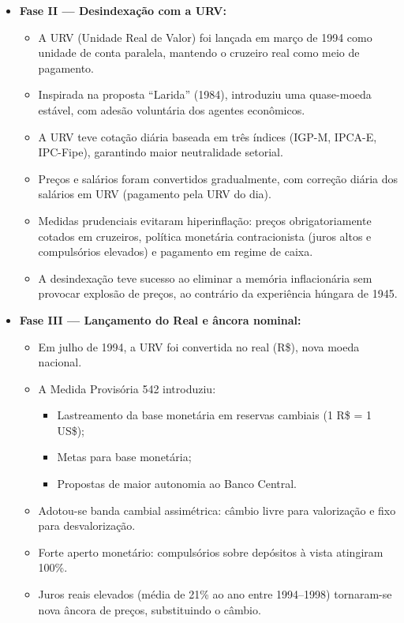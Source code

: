 \documentclass[a4paper,12pt]{article}[abntex2]
\begin{document}
\begin{itemize}
    \item \textbf{Fase II — Desindexação com a URV:}
    \begin{itemize}
        \item A URV (Unidade Real de Valor) foi lançada em março de 1994 como unidade de conta paralela, mantendo o cruzeiro real como meio de pagamento.
        \item Inspirada na proposta “Larida” (1984), introduziu uma quase-moeda estável, com adesão voluntária dos agentes econômicos.
        \item A URV teve cotação diária baseada em três índices (IGP-M, IPCA-E, IPC-Fipe), garantindo maior neutralidade setorial.
        \item Preços e salários foram convertidos gradualmente, com correção diária dos salários em URV (pagamento pela URV do dia).
        \item Medidas prudenciais evitaram hiperinflação: preços obrigatoriamente cotados em cruzeiros, política monetária contracionista (juros altos e compulsórios elevados) e pagamento em regime de caixa.
        \item A desindexação teve sucesso ao eliminar a memória inflacionária sem provocar explosão de preços, ao contrário da experiência húngara de 1945.
    \end{itemize}

    \item \textbf{Fase III — Lançamento do Real e âncora nominal:}
    \begin{itemize}
        \item Em julho de 1994, a URV foi convertida no real (R\$), nova moeda nacional.
        \item A Medida Provisória 542 introduziu:
        \begin{itemize}
            \item Lastreamento da base monetária em reservas cambiais (1 R\$ = 1 US\$);
            \item Metas para base monetária;
            \item Propostas de maior autonomia ao Banco Central.
        \end{itemize}
        \item Adotou-se banda cambial assimétrica: câmbio livre para valorização e fixo para desvalorização.
        \item Forte aperto monetário: compulsórios sobre depósitos à vista atingiram 100\%.
        \item Juros reais elevados (média de 21\% ao ano entre 1994–1998) tornaram-se nova âncora de preços, substituindo o câmbio.
    \end{itemize}


\end{itemize}
\end{document}
